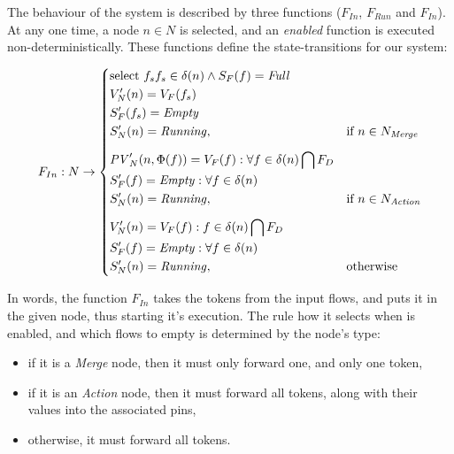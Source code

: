 \begin{definition} 
	The behaviour of the system is described by three functions (\(F_{In}\), \(F_{Run}\) and \(F_{In}\)). At any one time, a node \(n \in N\) is selected, and an \emph{enabled} function is executed non-deterministically. These functions define the state-transitions for our system:

\begin{equation}
	F_{In} : N \rightarrow
	\begin{cases}
		\begin{aligned}[b]
			&\text{select } f_s f_s \in \delta(n) \wedge S_F(f) = \mathit{Full} \\
			&V_N^\prime(n) = V_F(f_s) \\
			&S_F^\prime(f_s) = \mathit{Empty} \\
			&S_N^\prime(n) = \mathit{Running},
		\end{aligned} & \text{if } n \in N_\mathit{Merge} \\[8pt]
		\begin{aligned}[b]
			&\mathit{PV}_N^\prime(n, \Phi(f)) = V_F(f) : \forall f \in \delta(n) \bigcap F_D \\
			&S_F^\prime(f) = \mathit{Empty} : \forall f \in \delta(n) \\
			&S_N^\prime(n) = \mathit{Running},
		\end{aligned} & \text{if } n \in N_\mathit{Action} \\[8pt]
		\begin{aligned}[b]
			&V_N^\prime(n) = V_F(f) : f \in \delta(n) \bigcap F_D \\
			&S_F^\prime(f) = \mathit{Empty} : \forall f \in \delta(n) \\
			&S_N^\prime(n) = \mathit{Running},
		\end{aligned} & \text{otherwise}
	\end{cases}
\end{equation}

In words, the function \(F_{In}\) takes the tokens from the input flows, and puts it in the given node, thus starting it's execution. The rule how it selects when is enabled, and which flows to empty is determined by the node's type:

\begin{itemize}
	\item if it is a \emph{Merge} node, then it must only forward one, and only one token,
	\item if it is an \emph{Action} node, then it must forward all tokens, along with their values into the associated pins,
	\item otherwise, it must forward all tokens.
\end{itemize}


\end{definition}
